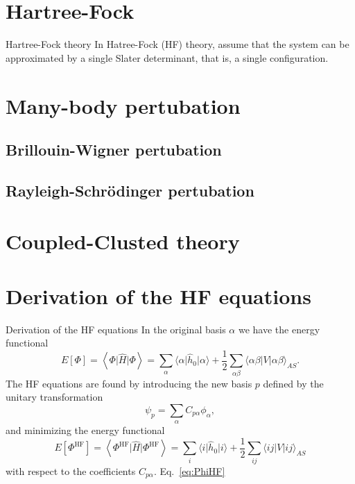 \documentclass[UKenglish,aspectratio=169]{beamer}
\begin{document}
\section{Hartree-Fock}

\begin{frame}{Hartree-Fock theory}
    In Hatree-Fock (HF) theory, assume that the system can be approximated by a single Slater determinant, that is, a single configuration.
\end{frame}

\section{Many-body pertubation}
\subsection{Brillouin-Wigner pertubation}
\subsection{Rayleigh-Schrödinger pertubation}

\section{Coupled-Clusted theory}

\appendix
\section{Derivation of the HF equations}

\begin{frame}{Derivation of the HF equations}
    In the original basis $\alpha$ we have the energy functional
    \begin{equation}
        E[\Phi]
        = \left\langle \Phi \vert \hat{H} \vert \Phi \right\rangle
        = \sum_{\alpha} \langle \alpha \vert \hat{h}_0 \vert \alpha \rangle
        + \frac{1}{2} \sum_{\alpha\beta} \langle \alpha\beta \vert V \vert \alpha \beta \rangle_{AS}.
    \end{equation}
    The HF equations are found by introducing the new basis $p$ defined by the unitary transformation
    \begin{equation}
        \psi_p = \sum_{\alpha} C_{p\alpha} \phi_\alpha,
    \end{equation}
    and minimizing the energy functional
    \begin{equation}\label{eq:PhiHF}
        E[\Phi^\mathrm{HF}]
        = \left\langle \Phi^\mathrm{HF} \vert \hat{H} \vert \Phi^\mathrm{HF} \right\rangle
        = \sum_{i} \langle i \vert \hat{h}_0 \vert i \rangle + \frac{1}{2} \sum_{ij} \langle ij \vert V \vert ij \rangle_{AS}
    \end{equation}
    with respect to the coefficients $C_{p\alpha}$. Eq.~\eqref{eq:PhiHF}
\end{frame}
\end{document}
